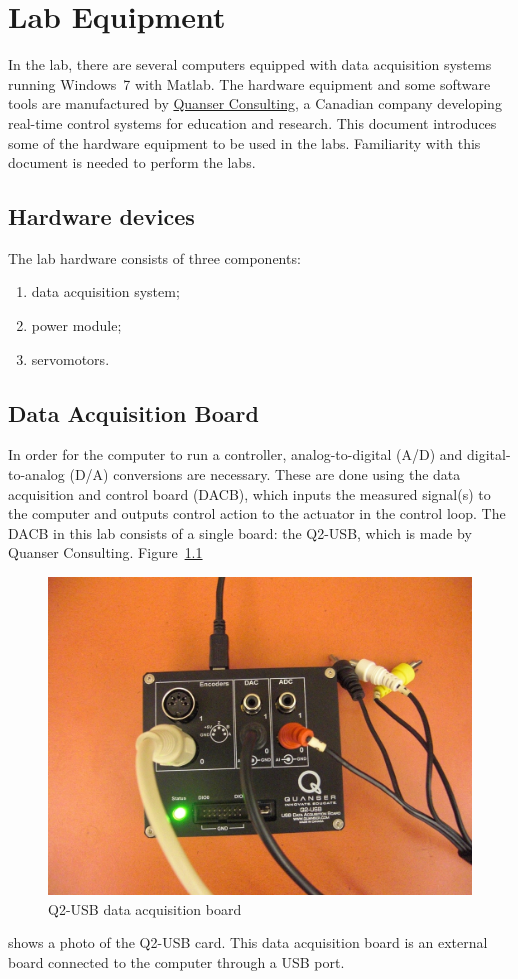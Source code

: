 \chapter{Lab Equipment}\label{chap:hardware}

In the lab, there are several computers equipped with data acquisition
systems running Windows~7 with Matlab. The hardware equipment and some
software tools are manufactured by \href{http://www.quanser.com/}{Quanser
    Consulting}, a Canadian company developing real-time control systems for
education and research. This document introduces some of the hardware
equipment to be used in the labs. Familiarity with this document is needed to
perform the labs.

\section{Hardware devices}

The lab hardware consists of three components:
\begin{enumerate}
    \item data acquisition system;
    \item power module;
    \item servomotors.
\end{enumerate}

\section{Data Acquisition Board}

In order for the computer to run a controller, analog-to-digital (A/D) and
digital-to-analog (D/A) conversions are necessary. These are done using the
data acquisition and control board (DACB), which inputs the measured
signal(s) to the computer and outputs control action to the actuator in the %
control loop.  The DACB in this lab consists of a single board: the Q2-USB,
which is made by Quanser Consulting.  Figure~\ref{fig:q2usb}
\begin{figure}[htbp]
    \centering
    \includegraphics[width=0.6\hsize]{pix/Q2USB.jpg}
    \caption{Q2-USB data acquisition board}\label{fig:q2usb}
\end{figure}%
shows a photo of the Q2-USB card. This data acquisition board is an external
board connected to the computer through a USB port.

